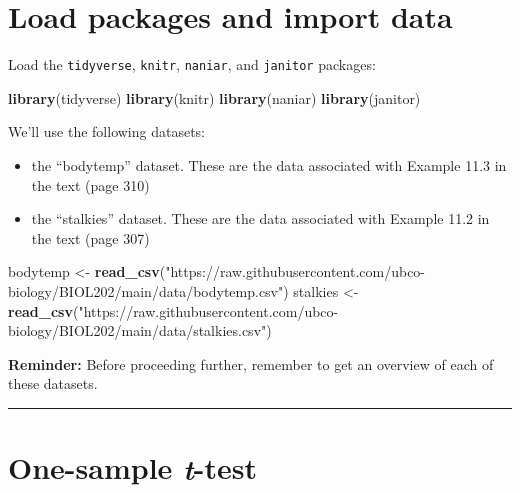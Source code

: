 \documentclass[
]{book}
\newenvironment{Shaded}{\begin{snugshade}}{\end{snugshade}}
\newcommand{\FunctionTok}[1]{\textcolor[rgb]{0.13,0.29,0.53}{\textbf{#1}}}
\newcommand{\NormalTok}[1]{#1}
\newcommand{\OtherTok}[1]{\textcolor[rgb]{0.56,0.35,0.01}{#1}}
\newcommand{\StringTok}[1]{\textcolor[rgb]{0.31,0.60,0.02}{#1}}
\providecommand{\tightlist}{%
  \setlength{\itemsep}{0pt}\setlength{\parskip}{0pt}}
\begin{document}
\section{Load packages and import data}\label{singlenum_packages_data}

Load the \texttt{tidyverse}, \texttt{knitr}, \texttt{naniar}, and \texttt{janitor} packages:

\begin{Shaded}
\begin{Highlighting}[]
\FunctionTok{library}\NormalTok{(tidyverse)}
\FunctionTok{library}\NormalTok{(knitr)}
\FunctionTok{library}\NormalTok{(naniar)}
\FunctionTok{library}\NormalTok{(janitor)}
\end{Highlighting}
\end{Shaded}

We'll use the following datasets:

\begin{itemize}
\tightlist
\item
  the ``bodytemp'' dataset. These are the data associated with Example 11.3 in the text (page 310)
\item
  the ``stalkies'' dataset. These are the data associated with Example 11.2 in the text (page 307)
\end{itemize}

\begin{Shaded}
\begin{Highlighting}[]
\NormalTok{bodytemp }\OtherTok{\textless{}{-}} \FunctionTok{read\_csv}\NormalTok{(}\StringTok{"https://raw.githubusercontent.com/ubco{-}biology/BIOL202/main/data/bodytemp.csv"}\NormalTok{)}
\NormalTok{stalkies }\OtherTok{\textless{}{-}} \FunctionTok{read\_csv}\NormalTok{(}\StringTok{"https://raw.githubusercontent.com/ubco{-}biology/BIOL202/main/data/stalkies.csv"}\NormalTok{)}
\end{Highlighting}
\end{Shaded}

\textbf{Reminder: }
Before proceeding further, remember to get an overview of each of these datasets.

\begin{center}\rule{0.5\linewidth}{0.5pt}\end{center}

\section{\texorpdfstring{One-sample \emph{t}-test}{One-sample t-test}}\label{onesamp_t_test}
\end{document}

